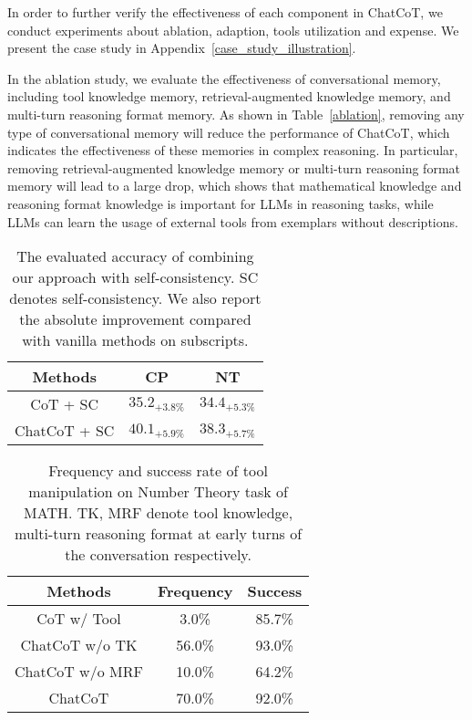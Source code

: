 In order to further verify the effectiveness of each component in ChatCoT, we conduct experiments about ablation, adaption, tools utilization and expense.
We present the case study in Appendix~\ref{case_study_illustration}.

In the ablation study, we evaluate the effectiveness of conversational memory, including tool knowledge memory, retrieval-augmented knowledge memory, and multi-turn reasoning format memory.
As shown in Table~\ref{ablation}, removing any type of conversational memory will reduce the performance of ChatCoT, which indicates the effectiveness of these memories in complex reasoning.
In particular, removing retrieval-augmented knowledge memory or multi-turn reasoning format memory will lead to a large drop, which shows that mathematical knowledge and reasoning format knowledge is important for LLMs in reasoning tasks, while LLMs can learn the usage of external tools from exemplars without descriptions.

\begin{table}
    \centering
    \begin{tabular}{ccc}
        \bottomrule
        \textbf{Methods} & \textbf{CP} & \textbf{NT} \\
        \hline
        CoT + SC & $35.2_{+3.8\%}$ & $34.4_{+5.3\%}$ \\
        ChatCoT + SC & $40.1_{+5.9\%}$ & $38.3_{+5.7\%}$ \\
        \bottomrule
    \end{tabular}
    \caption{The evaluated accuracy of combining our approach with self-consistency. SC denotes self-consistency. We also report the absolute improvement compared with vanilla methods on subscripts.}
    \label{comb_classical}
\end{table}

\begin{table}
    \centering
    \begin{tabular}{ccc}
        \bottomrule
        \textbf{Methods} & \textbf{Frequency} & \textbf{Success}  \\
        \hline
        CoT w/ Tool & 3.0\% & 85.7\% \\
        ChatCoT w/o TK & 56.0\% & 93.0\% \\
        ChatCoT w/o MRF & 10.0\% & 64.2\% \\
        ChatCoT & 70.0\% & 92.0\% \\
        \bottomrule
    \end{tabular}
    \caption{Frequency and success rate of tool manipulation on Number Theory task of MATH. TK, MRF denote tool knowledge, multi-turn reasoning format at early turns of the conversation respectively.}
    \label{tool_ratio}
\end{table}

